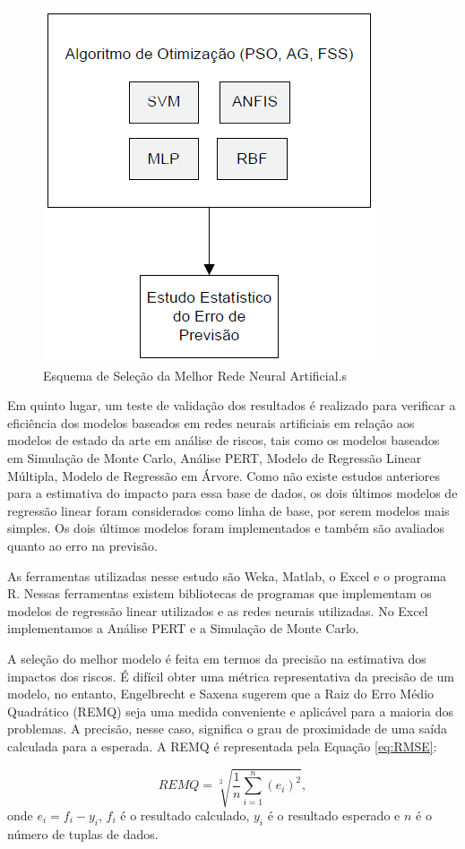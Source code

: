 \begin{figure}[h]
	\centering
	\includegraphics[width=.45\textwidth]{image/MetodologiaDissertacao2.png}
	\caption{Esquema de Seleção da Melhor Rede Neural Artificial.s}
	\label{fig:method2}
\end{figure}

Em quinto lugar, um teste de validação dos resultados é realizado para verificar a eficiência dos modelos baseados em redes neurais artificiais em relação aos modelos de estado da arte em análise de riscos, tais como os modelos baseados em Simulação de Monte Carlo, Análise PERT, Modelo de Regressão Linear Múltipla, Modelo de Regressão em Árvore. Como não existe estudos anteriores para a estimativa do impacto para essa base de dados, os dois últimos modelos de regressão linear foram considerados como linha de base, por serem modelos mais simples. Os dois últimos modelos foram implementados e também são avaliados quanto ao erro na previsão.

As ferramentas utilizadas nesse estudo são Weka, Matlab, o Excel e o programa R. Nessas ferramentas existem bibliotecas de programas que implementam os modelos de regressão linear utilizados e as redes neurais utilizadas. No Excel implementamos a Análise PERT e a Simulação de Monte Carlo.

A seleção do melhor modelo é feita em termos da precisão na estimativa dos impactos dos riscos. É difícil obter uma métrica representativa da precisão de um modelo, no entanto, Engelbrecht \cite{engelbrecht2007computational} e Saxena \cite{saxena2012software} sugerem que a Raiz do Erro Médio Quadrático (REMQ) seja uma medida conveniente e aplicável para a maioria dos problemas. A precisão, nesse caso, significa o grau de proximidade de uma saída calculada para a esperada. A REMQ é representada pela Equação \ref{eq:RMSE}:

\begin{equation}\label{eq:RMSE}
    REMQ= \sqrt[2]{\frac{1}{n}\sum_{i=1}^{n} (e_i)^2} ,
\end{equation}
onde $e_i=f_i - y_i$, $f_i$ é o resultado calculado, $y_i$ é o resultado esperado e $n$ é o número de tuplas de dados.

